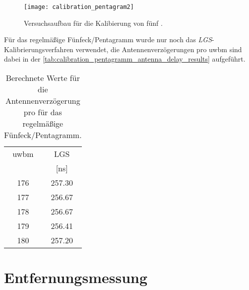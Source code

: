 \begin{figure}[h]
	\centering
	\texttt{[image: calibration\_pentagram2]}
	\caption{Versuchsaufbau für die Kalibierung von fünf .}
	\label{fig:calibration_pentagram2}
\end{figure}

Für das regelmäßige Fünfeck/Pentagramm wurde nur noch das \textit{LGS}-Ka\-li\-brie\-rungs\-ver\-fahren verwendet, die Antennenverzögerungen pro \Gls{uwbm} sind dabei in der \autoref{tab:calibration_pentagramm_antenna_delay_results} aufgeführt.

\begin{table}[h]
	\centering
	\begin{tabular}{||c||c||}
\hline
\Gls{uwbm} & LGS \\
 & [\si{\nano\second}] \\
\hline\hline
176 & \num{257.30} \\
177 & \num{256.67} \\
178 & \num{256.67} \\
179 & \num{256.41} \\
180 & \num{257.20} \\

\hline
	\end{tabular}
	\caption{Berechnete Werte für die Antennenverzögerung pro  für das regelmäßige Fünfeck/Pentagramm.}
	\label{tab:calibration_pentagramm_antenna_delay_results}
\end{table}


%

%
\section{Entfernungsmessung}

